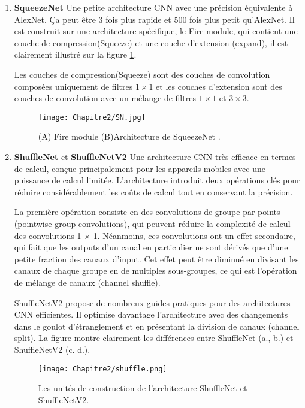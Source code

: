 \begin{enumerate}
\item \textbf{SqueezeNet} \cite{SqueezeNet2016}
Une petite architecture CNN avec une précision équivalente à AlexNet. Ça peut être  3 fois plus rapide et 500 fois plus petit qu'AlexNet.
Il est construit sur une architecture spécifique, le Fire module, qui contient une couche de compression(Squeeze) et une couche d'extension (expand), il est clairement illustré sur la figure \ref{SN}.

Les couches de compression(Squeeze) sont des couches de convolution composées uniquement de filtres $1\times 1$ et les couches d'extension sont des couches de convolution avec un mélange de filtres $1 \times 1$ et $3 \times 3$.
\begin{figure}[H]
\centering
  \texttt{[image: Chapitre2/SN.jpg]} 
   \caption{(A) Fire module (B)Architecture de SqueezeNet \cite{SqueezeNet2016}.}
   \label{SN}
 \end{figure}

\item \textbf{ShuffleNet} \cite{shufflenet2018} et \textbf{ShuffleNetV2}\cite{shufflenetV2}
Une architecture CNN très efficace en termes de calcul, conçue principalement pour les appareils mobiles avec une puissance de calcul limitée. L'architecture introduit deux opérations clés pour réduire considérablement les coûts de calcul tout en conservant la précision. 

La première opération consiste en des convolutions de groupe par points (pointwise group convolutions), qui peuvent réduire la complexité de calcul des convolutions 1 × 1. Néanmoins, ces convolutions ont un effet secondaire, qui fait que les outputs d'un canal en particulier ne sont dérivés que d'une petite fraction des canaux d'input. Cet effet peut être diminué en divisant les canaux de chaque groupe en de multiples sous-groupes, ce qui est l'opération de mélange de canaux (channel shuffle).

ShuffleNetV2 propose de nombreux guides pratiques pour des architectures CNN efficientes. Il optimise davantage l’architecture avec des changements dans le goulot d’étranglement et en présentant la division de canaux (channel split). La figure montre clairement les différences entre ShuffleNet (a., b.) et ShuffleNetV2 (c. d.).

\begin{figure}[H]
\centering
  \texttt{[image: Chapitre2/shuffle.png]} 
   \caption{Les unités de construction de l'architecture ShuffleNet  \cite{shufflenet2018} et ShuffleNetV2\cite{shufflenetV2}.}
   \label{shuffle}
 \end{figure}
 

\end{enumerate}
